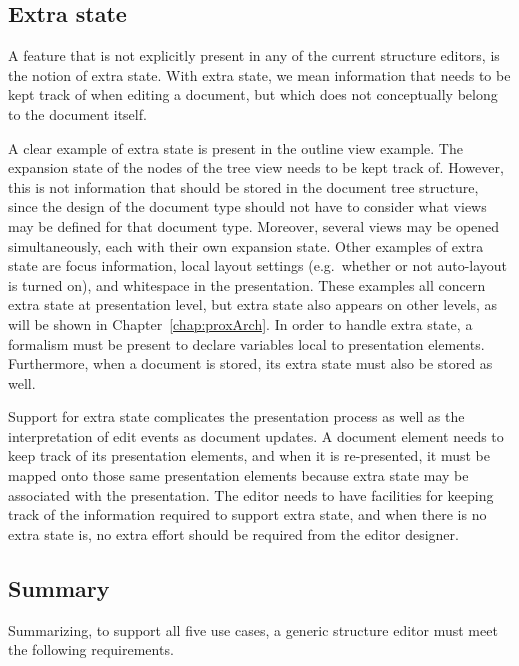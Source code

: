 %																
\subsection{Extra state} \label{sect:editingExtraState}

A feature that is not explicitly present in any of the current structure editors, is the notion of extra state. With extra state, we mean information that needs to be kept track of when editing a document, but which does not conceptually belong to the document itself. 

A clear example of extra state is present in the outline view example. The expansion state of the nodes of the tree view needs to be kept track of. However, this is not information that should be stored in the document tree structure, since the design of the document type should not have to consider what views may be defined for that document type. Moreover, several views may be opened simultaneously, each with their own expansion state.  Other examples of extra state are focus information, local layout settings (e.g.\ whether or not auto-layout is turned on), and whitespace in the presentation. These examples all concern extra state at presentation level, but extra state also appears on other levels, as will be shown in Chapter~\ref{chap:proxArch}. In order to handle extra state, a formalism must be present to declare variables local to presentation elements. Furthermore, when a document is stored, its extra state must also be stored as well.

Support for extra state complicates the presentation process as well as the interpretation of edit events as document updates. A document element needs to keep track of its presentation elements, and when it is re-presented, it must be mapped onto those same presentation elements because extra state may be associated with the presentation. The editor needs to have facilities for keeping track of the information required to support extra state, and when there is no extra state is, no extra effort should be required from the editor designer.



%																
\subsection{Summary}

Summarizing, to support all five use cases, a generic structure editor must meet the following requirements.

